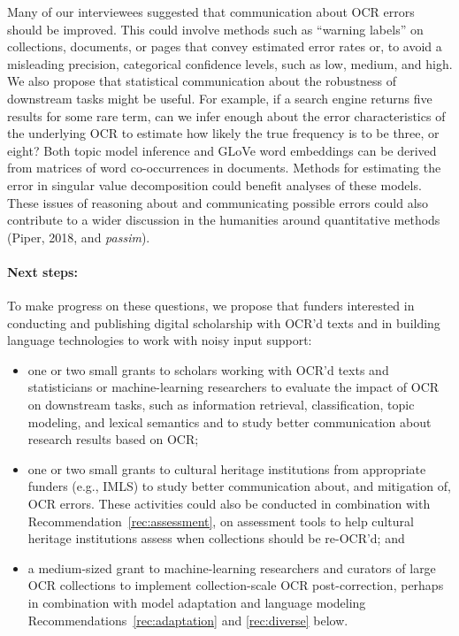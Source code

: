 \documentclass[twoside,11pt]{report}
\begin{document}
Many of our interviewees suggested that communication about OCR errors should be improved. This could involve methods such as ``warning labels'' on collections, documents, or pages that convey estimated error rates or, to avoid a misleading precision, categorical confidence levels, such as low, medium, and high. We also propose that statistical communication about the robustness of downstream tasks might be useful. For example, if a search engine returns five results for some rare term, can we infer enough about the error characteristics of the underlying OCR to estimate how likely the true frequency is to be three, or eight? Both topic model inference and GLoVe word embeddings can be derived from matrices of word co-occurrences in documents. Methods for estimating the error in singular value decomposition could benefit analyses of these models. These issues of reasoning about and communicating possible errors could also contribute to a wider discussion in the humanities around quantitative methods (Piper, 2018, and \emph{passim}).

\paragraph{Next steps:} To make progress on these questions, we propose that funders interested in conducting and publishing digital scholarship with OCR'd texts and in building language technologies to work with noisy input support:
\begin{itemize}

\item one or two small grants to scholars working with OCR'd texts and statisticians or machine-learning researchers to evaluate the impact of OCR on downstream tasks, such as information retrieval, classification, topic modeling, and lexical semantics and to study better communication about research results based on OCR;

\item one or two small grants to cultural heritage institutions from appropriate funders (e.g., IMLS) to study better communication about, and mitigation of, OCR errors. These activities could also be conducted in combination with Recommendation~\ref{rec:assessment}, on assessment tools to help cultural heritage institutions assess when collections should be re-OCR'd; and

\item a medium-sized grant to machine-learning researchers and curators of large OCR collections to implement collection-scale OCR post-correction, perhaps in combination with model adaptation and language modeling Recommendations~\ref{rec:adaptation} and \ref{rec:diverse} below.

\end{itemize}
\end{document}
